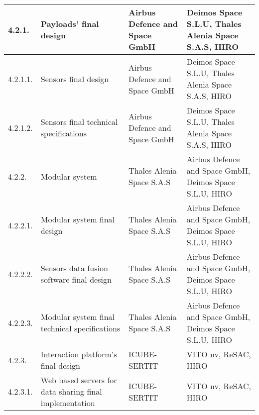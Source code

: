 \begin{longtable}[H]{p{1.5cm} >{\raggedright\arraybackslash}p{4cm} >{\raggedright\arraybackslash}p{3.8cm} >{\raggedright\arraybackslash}p{4cm}}
	\midrule
	
	4.2.1. & Payloads' final design & Airbus Defence and Space GmbH & Deimos Space S.L.U, Thales Alenia Space S.A.S, HIRO\vspace{0.2cm} \\
	
	\midrule
	
	4.2.1.1. & Sensors final design & Airbus Defence and Space GmbH & Deimos Space S.L.U, Thales Alenia Space S.A.S, HIRO\vspace{0.2cm} \\
	
	\midrule
	
	4.2.1.2. & Sensors final technical specifications & Airbus Defence and Space GmbH & Deimos Space S.L.U, Thales Alenia Space S.A.S, HIRO\vspace{0.2cm} \\
	
	\midrule
	
	4.2.2. & Modular system & Thales Alenia Space S.A.S & Airbus Defence and Space GmbH, Deimos Space S.L.U, HIRO\vspace{0.2cm} \\
	
	\midrule
	
	4.2.2.1. & Modular system final design & Thales Alenia Space S.A.S & Airbus Defence and Space GmbH, Deimos Space S.L.U, HIRO\vspace{0.2cm} \\
	
	\midrule
	
	4.2.2.2. & Sensors data fusion software final design & Thales Alenia Space S.A.S & Airbus Defence and Space GmbH, Deimos Space S.L.U, HIRO\vspace{0.2cm} \\
	
	\midrule
	
	4.2.2.3. & Modular system final technical specifications & Thales Alenia Space S.A.S & Airbus Defence and Space GmbH, Deimos Space S.L.U, HIRO\vspace{0.2cm} \\
	
	\midrule
	
	4.2.3. & Interaction platform's final design & ICUBE-SERTIT & VITO nv, ReSAC, HIRO\vspace{0.2cm} \\
	
	\midrule
	
	4.2.3.1. & Web based servers for data sharing final implementation & ICUBE-SERTIT & VITO nv, ReSAC, HIRO\vspace{0.2cm} \\
	

\end{longtable}
